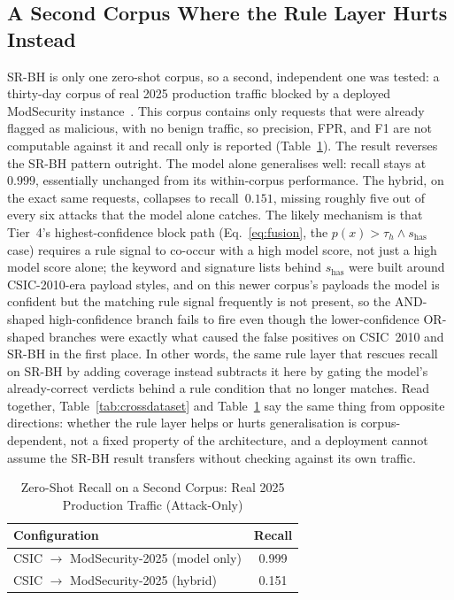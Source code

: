 \documentclass[conference]{IEEEtran}
\begin{document}
\subsection{A Second Corpus Where the Rule Layer Hurts Instead}
\label{sec:thirdcorpus}
SR-BH is only one zero-shot corpus, so a second, independent
one was tested: a thirty-day corpus of real 2025 production traffic blocked by a
deployed ModSecurity instance~\cite{modsec30day2025}. This corpus
contains only requests that were already flagged as malicious, with no
benign traffic, so precision, FPR, and F1 are not computable against it
and recall only is reported (Table~\ref{tab:thirdcorpus}). The result
reverses the SR-BH pattern outright. The model alone generalises well:
recall stays at $0.999$, essentially unchanged from its within-corpus
performance. The hybrid, on the exact same requests, collapses to
recall~$0.151$, missing roughly five out of every six attacks that the
model alone catches. The likely mechanism is that Tier~4's
highest-confidence block path (Eq.~\eqref{eq:fusion}, the
$p(x){>}\tau_h \wedge s_{\text{has}}$ case) requires a rule signal to
co-occur with a high model score, not just a high model score alone; the
keyword and signature lists behind $s_{\text{has}}$ were built around
CSIC-2010-era payload styles, and on this newer corpus's payloads the
model is confident but the matching rule signal frequently is not
present, so the AND-shaped high-confidence branch fails to fire even
though the lower-confidence OR-shaped branches were exactly what caused
the false positives on CSIC~2010 and SR-BH in the first place. In other
words, the same rule layer that rescues recall on SR-BH by adding
coverage instead subtracts it here by gating the model's already-correct
verdicts behind a rule condition that no longer matches. Read together,
Table~\ref{tab:crossdataset} and Table~\ref{tab:thirdcorpus} say the
same thing from opposite directions: whether the rule layer helps or
hurts generalisation is corpus-dependent, not a fixed property of the
architecture, and a deployment cannot assume the SR-BH result
transfers without checking against its own traffic.

\begin{table}[t]
\centering
\caption{Zero-Shot Recall on a Second Corpus: Real 2025 Production Traffic (Attack-Only)}
\label{tab:thirdcorpus}
\begin{tabular}{@{}lc@{}}
\toprule
Configuration & Recall \\
\midrule
CSIC $\to$ ModSecurity-2025 (model only) & 0.999 \\
CSIC $\to$ ModSecurity-2025 (hybrid) & 0.151 \\
\bottomrule
\end{tabular}
\end{table}
\end{document}
